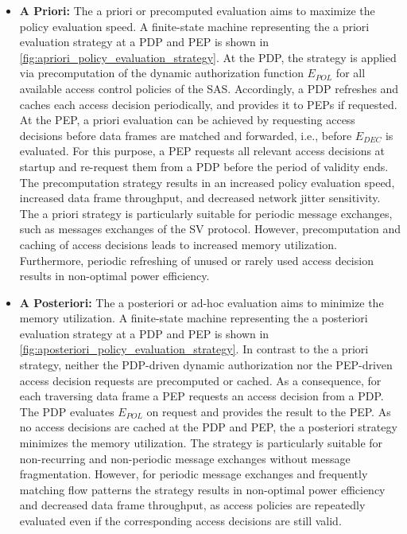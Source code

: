 \begin{itemize}
    \item \textbf{A Priori:} The a priori or precomputed evaluation aims to maximize the policy evaluation speed.
    A finite-state machine representing the a priori evaluation strategy at a PDP and PEP is shown in \autoref{fig:apriori_policy_evaluation_strategy}.
    At the PDP, the strategy is applied via precomputation of the dynamic authorization function $E_{POL}$ for all available access control policies of the SAS.
    Accordingly, a PDP refreshes and caches each access decision periodically, and provides it to PEPs if requested.
    At the PEP, a priori evaluation can be achieved by requesting access decisions before data frames are matched and forwarded, i.e., before $E_{DEC}$ is evaluated.
    For this purpose, a PEP requests all relevant access decisions at startup and re-request them from a PDP before the period of validity ends.
    The precomputation strategy results in an increased policy evaluation speed, increased data frame throughput, and decreased network jitter sensitivity.
    The a priori strategy is particularly suitable for periodic message exchanges, such as messages exchanges of the SV protocol.
    However, precomputation and caching of access decisions leads to increased memory utilization.
    Furthermore, periodic refreshing of unused or rarely used access decision results in non-optimal power efficiency.
    
    \item \textbf{A Posteriori:} The a posteriori or ad-hoc evaluation aims to minimize the memory utilization.
    A finite-state machine representing the a posteriori evaluation strategy at a PDP and PEP is shown in \autoref{fig:aposteriori_policy_evaluation_strategy}.
    In contrast to the a priori strategy, neither the PDP-driven dynamic authorization nor the PEP-driven access decision requests are precomputed or cached.
    As a consequence, for each traversing data frame a PEP requests an access decision from a PDP.
    The PDP evaluates $E_{POL}$ on request and provides the result to the PEP.
    As no access decisions are cached at the PDP and PEP, the a posteriori strategy minimizes the memory utilization.
    The strategy is particularly suitable for non-recurring and non-periodic message exchanges without message fragmentation.
    However, for periodic message exchanges and frequently matching flow patterns the strategy results in non-optimal power efficiency and decreased data frame throughput, as access policies are repeatedly evaluated even if the corresponding access decisions are still valid.


\end{itemize}
